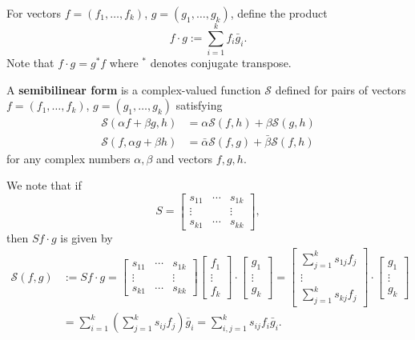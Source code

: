 \documentclass[11pt, oneside, a4paper]{article}
\begin{document}
\begin{defn}\cite[p.285]{CoddingtonLevinson}\label{defn:f cdot g}
    For vectors $f=(f_1,\ldots,f_k)$, $g=(g_1,\ldots,g_k)$, define the product
    \[f\cdot g:=\sum_{i=1}^k f_i\bar{g}_i.\]
    Note that $f\cdot g = g^*f$ where $^*$ denotes conjugate transpose.
\end{defn}

\begin{defn}\cite[p.285]{CoddingtonLevinson}\label{defn:semibilinear form}
    A \textbf{semibilinear form} is a complex-valued function $\mathcal{S}$ defined for pairs of vectors $f=(f_1,\ldots,f_k)$, $g=(g_1,\ldots,g_k)$ satisfying
    \begin{align*}
        \mathcal{S}(\alpha f+\beta g, h)&=\alpha\mathcal{S}(f,h) + \beta\mathcal{S}(g,h)\\
        \mathcal{S}(f, \alpha g + \beta h) &= \bar{\alpha}\mathcal{S}(f,g) + \bar{\beta}\mathcal{S}(f, h)
    \end{align*}
    for any complex numbers $\alpha, \beta$ and vectors $f,g,h$.
\end{defn}
We note that if
\[S = \begin{bmatrix}
    s_{11} & \cdots & s_{1k}\\
    \vdots &  & \vdots\\
    s_{k1} & \cdots & s_{kk}
\end{bmatrix},\]
then $Sf\cdot g$ is given by
\begin{equation}\label{eq:semibilinear form}
    \begin{split}
    \mathcal{S}(f,g) &:= Sf\cdot g = \begin{bmatrix}
        s_{11} & \cdots & s_{1k}\\
        \vdots & & \vdots\\
        s_{k1} & \cdots & s_{kk}
    \end{bmatrix} \begin{bmatrix}
        f_1\\
        \vdots\\
        f_k
    \end{bmatrix} \cdot \begin{bmatrix}
        g_1\\
        \vdots\\
        g_k
    \end{bmatrix} = \begin{bmatrix}
        \sum_{j=1}^k s_{1j}f_j\\
        \vdots\\
        \sum_{j=1}^k s_{kj}f_j
    \end{bmatrix}\cdot \begin{bmatrix}
        g_1\\
        \vdots\\
        g_k
    \end{bmatrix}\\
    &= \sum_{i=1}^k\left(\sum_{j=1}^k s_{ij}f_j\right)\bar{g}_i =\sum_{i,j=1}^k s_{ij}f_i\bar{g}_i.
    \end{split}
\end{equation}
\end{document}

